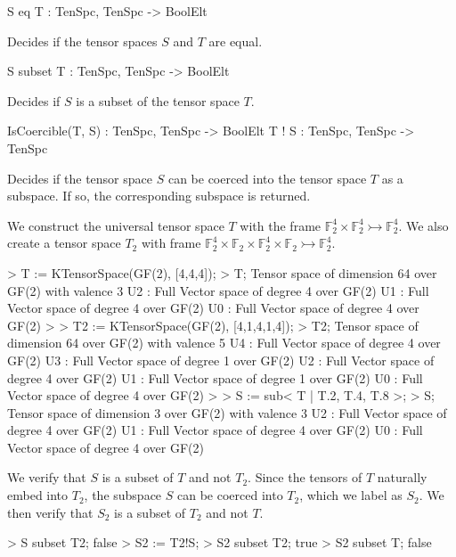 \begin{intrinsics}
S eq T : TenSpc, TenSpc -> BoolElt
\end{intrinsics}

Decides if the tensor spaces $S$ and $T$ are equal.

\begin{intrinsics}
S subset T : TenSpc, TenSpc -> BoolElt
\end{intrinsics}

Decides if $S$ is a subset of the tensor space $T$.

\begin{intrinsics}
IsCoercible(T, S) : TenSpc, TenSpc -> BoolElt
T ! S : TenSpc, TenSpc -> TenSpc
\end{intrinsics}

Decides if the tensor space $S$ can be coerced into the tensor space $T$ as a subspace. If so, the corresponding subspace is returned. 

\begin{example}[TenSpcContainment]

We construct the universal tensor space $T$ with the frame $\mathbb{F}_2^4\times \mathbb{F}_2^4\rightarrowtail \mathbb{F}_2^4$. 
We also create a tensor space $T_2$ with frame $\mathbb{F}_2^4\times \mathbb{F}_2\times \mathbb{F}_2^4\times\mathbb{F}_2\rightarrowtail \mathbb{F}_2^4$.

\begin{code}
> T := KTensorSpace(GF(2), [4,4,4]);
> T;
Tensor space of dimension 64 over GF(2) with valence 3
U2 : Full Vector space of degree 4 over GF(2)
U1 : Full Vector space of degree 4 over GF(2)
U0 : Full Vector space of degree 4 over GF(2)
> 
> T2 := KTensorSpace(GF(2), [4,1,4,1,4]);
> T2;
Tensor space of dimension 64 over GF(2) with valence 5
U4 : Full Vector space of degree 4 over GF(2)
U3 : Full Vector space of degree 1 over GF(2)
U2 : Full Vector space of degree 4 over GF(2)
U1 : Full Vector space of degree 1 over GF(2)
U0 : Full Vector space of degree 4 over GF(2)
> 
> S := sub< T | T.2, T.4, T.8 >;
> S;
Tensor space of dimension 3 over GF(2) with valence 3
U2 : Full Vector space of degree 4 over GF(2)
U1 : Full Vector space of degree 4 over GF(2)
U0 : Full Vector space of degree 4 over GF(2)
\end{code}

We verify that $S$ is a subset of $T$ and not $T_2$. 
Since the tensors of $T$ naturally embed into $T_2$, the subspace $S$ can be coerced into $T_2$, which we label as $S_2$. 
We then verify that $S_2$ is a subset of $T_2$ and not $T$. 
\begin{code}
> S subset T2;
false
> S2 := T2!S;
> S2 subset T2;
true
> S2 subset T;
false
\end{code}
\end{example}

